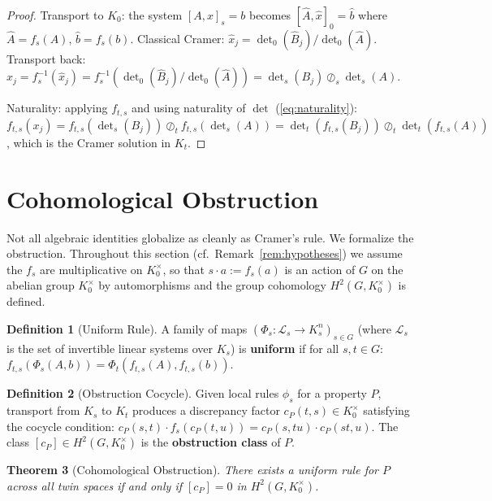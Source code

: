 \documentclass[11pt,twocolumn]{article}
\theoremstyle{plain}
\newtheorem{theorem}{Theorem}
\theoremstyle{definition}
\newtheorem{definition}[theorem]{Definition}
\theoremstyle{remark}
\begin{document}
\begin{proof}
Transport to $K_0$: the system $[A, x]_s = b$ becomes $[\hat{A}, \hat{x}]_0 = \hat{b}$ where $\hat{A} = f_s(A)$, $\hat{b} = f_s(b)$. Classical Cramer: $\hat{x}_j = \det_0(\hat{B}_j) / \det_0(\hat{A})$. Transport back: $x_j = f_s^{-1}(\hat{x}_j) = f_s^{-1}(\det_0(\hat{B}_j) / \det_0(\hat{A})) = \det_s(B_j) \oslash_s \det_s(A)$.

Naturality: applying $f_{t,s}$ and using naturality of $\det$ (\ref{eq:naturality}):
$f_{t,s}(x_j) = f_{t,s}(\det_s(B_j)) \oslash_t f_{t,s}(\det_s(A)) = \det_t(f_{t,s}(B_j)) \oslash_t \det_t(f_{t,s}(A))$, which is the Cramer solution in $K_t$.
\end{proof}


\section{Cohomological Obstruction}
\label{sec:cohomology}

Not all algebraic identities globalize as cleanly as Cramer's rule. We formalize the obstruction. Throughout this section (cf.\ Remark~\ref{rem:hypotheses}) we assume the $f_s$ are multiplicative on $K_0^\times$, so that $s \cdot a := f_s(a)$ is an action of $G$ on the abelian group $K_0^\times$ by automorphisms and the group cohomology $H^2(G, K_0^\times)$ is defined.

\begin{definition}[Uniform Rule]\label{def:uniform}
A family of maps $(\Phi_s: \mathcal{L}_s \to K_s^n)_{s \in G}$ (where $\mathcal{L}_s$ is the set of invertible linear systems over $K_s$) is \textbf{uniform} if for all $s, t \in G$:
$f_{t,s}(\Phi_s(A, b)) = \Phi_t(f_{t,s}(A), f_{t,s}(b))$.
\end{definition}

\begin{definition}[Obstruction Cocycle]\label{def:cocycle}
Given local rules $\phi_s$ for a property $P$, transport from $K_s$ to $K_t$ produces a discrepancy factor $c_P(t, s) \in K_0^\times$ satisfying the cocycle condition:
$c_P(s,t) \cdot f_s(c_P(t,u)) = c_P(s,tu) \cdot c_P(st,u)$.
The class $[c_P] \in H^2(G, K_0^\times)$ is the \textbf{obstruction class} of $P$.
\end{definition}

\begin{theorem}[Cohomological Obstruction]\label{thm:obstruction}
There exists a uniform rule for $P$ across all twin spaces if and only if $[c_P] = 0$ in $H^2(G, K_0^\times)$.
\end{theorem}
\end{document}

